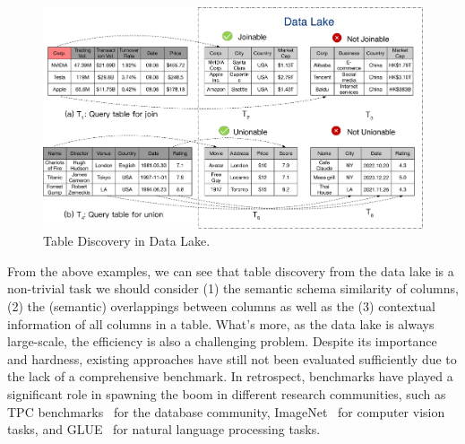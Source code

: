 \begin{figure}[h]
	\centering
	\includegraphics[width=0.8\linewidth]{fig/example.pdf}
	\caption{Table Discovery in Data Lake.}
	\label{fig:example}
\end{figure}


From the above examples, we can see that table discovery from the data lake is a non-trivial task we should consider (1) the semantic schema similarity of columns, (2) the (semantic) overlappings between columns as well as the (3) contextual information of all columns in a table.
What's more, as the data lake is always large-scale, the efficiency is also a challenging problem. Despite its importance and hardness, existing approaches have still not been evaluated  sufficiently due to the lack of a comprehensive benchmark.  In retrospect, benchmarks have played a significant role
in spawning the boom in different research communities, such as
TPC benchmarks~\cc{\cite{}} for the database community, ImageNet~\cc{\cite{}} for computer vision tasks, and GLUE~\cc{\cite{}} for natural language processing tasks.







